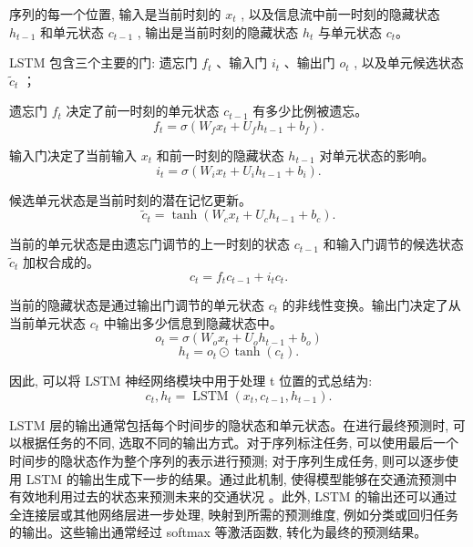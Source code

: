 序列的每一个位置, 输入是当前时刻的 \({x}_{t}\) , 以及信息流中前一时刻的隐藏状态 \({h}_{t - 1}\) 和单元状态 \({c}_{t - 1}\) , 输出是当前时刻的隐藏状态 \({h}_{t}\) 与单元状态 \({c}_{t}\)。

LSTM 包含三个主要的门: 遗忘门 \({{f}}_{{t}}\) 、输入门 \({{i}}_{{t}}\) 、输出门 \({{o}}_{{t}}\) , 以及单元候选状态 \({\widetilde{c}}_{{t}}\) ；

遗忘门 \({f}_{t}\) 决定了前一时刻的单元状态 \({c}_{t - 1}\) 有多少比例被遗忘。
\[
{f}_{t} = \sigma \left( {{W}_{f}{x}_{t} + {U}_{f}{h}_{t - 1} + {b}_{f}}\right).
\]

输入门决定了当前输入 \({x}_{t}\) 和前一时刻的隐藏状态 \({h}_{t - 1}\) 对单元状态的影响。
\[
{i}_{t} = \sigma \left( {{W}_{i}{x}_{t} + {U}_{i}{h}_{t - 1} + {b}_{i}}\right).
\]

候选单元状态是当前时刻的潜在记忆更新。
\[
{\widetilde{c}}_{t} = \tanh \left( {{W}_{c}{x}_{t} + {U}_{c}{h}_{t - 1} + {b}_{c}}\right).
\]

当前的单元状态是由遗忘门调节的上一时刻的状态 \({c}_{t - 1}\) 和输入门调节的候选状态 \({\widetilde{c}}_{t}\) 加权合成的。
\[
{c}_{t} = {f}_{t}{c}_{t - 1} + {i}_{t}{c}_{t}.
\]

当前的隐藏状态是通过输出门调节的单元状态 \({c}_{t}\) 的非线性变换。输出门决定了从当前单元状态 \({c}_{t}\) 中输出多少信息到隐藏状态中。
\[
{o}_{t} = \sigma \left( {{W}_{o}{x}_{t} + {U}_{o}{h}_{t - 1} + {b}_{o}}\right)
\]
\[
{h}_{t} = {o}_{t} \odot  \tanh \left( {c}_{t}\right).
\]

因此, 可以将 LSTM 神经网络模块中用于处理 t 位置的式总结为:
\[
{c}_{t}, {h}_{t} = \operatorname{LSTM}\left( {{x}_{t}, {c}_{t - 1}, {h}_{t - 1}}\right).
\]

LSTM 层的输出通常包括每个时间步的隐状态和单元状态。在进行最终预测时, 可以根据任务的不同, 选取不同的输出方式。对于序列标注任务, 可以使用最后一个时间步的隐状态作为整个序列的表示进行预测; 对于序列生成任务, 则可以逐步使用 LSTM 的输出生成下一步的结果。通过此机制, 使得模型能够在交通流预测中有效地利用过去的状态来预测未来的交通状况 \parencite{2022_刘建伟_循环神经网络研究综述}。此外, LSTM 的输出还可以通过全连接层或其他网络层进一步处理, 映射到所需的预测维度, 例如分类或回归任务的输出。这些输出通常经过 softmax 等激活函数, 转化为最终的预测结果。



